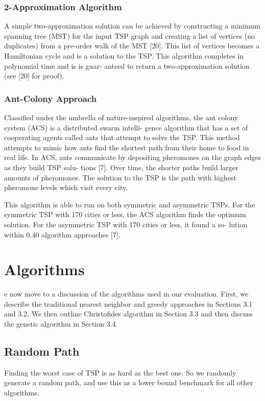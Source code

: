 \documentclass[10pt,twocolumn,letterpaper]{article}
\begin{document}
\subsubsection{2-Approximation Algorithm}
A simple two-approximation solution can be achieved by
constructing a minimum spanning tree (MST) for the input
TSP graph and creating a list of vertices (no duplicates)
from a pre-order walk of the MST [20]. This list of vertices
becomes a Hamiltonian cycle and is a solution to the TSP.
This algorithm completes in polynomial time and is is guar-
anteed to return a two-approximation solution (see [20] for
proof).

\subsubsection{Ant-Colony Approach}
Classified under the umbrella of nature-inspired algorithms,
the ant colony system (ACS) is a distributed swarm intelli-
gence algorithm that has a set of cooperating agents called
ants that attempt to solve the TSP. This method attempts
to mimic how ants find the shortest path from their home to
food in real life. In ACS, ants communicate by depositing
pheromones on the graph edges as they build TSP solu-
tions [7]. Over time, the shorter paths build larger amounts
of pheromones. The solution to the TSP is the path with
highest pheromone levels which visit every city.

This algorithm is able to run on both symmetric and
asymmetric TSPs. For the symmetric TSP with 170 cities
or less, the ACS algorithm finds the optimum solution. For
the asymmetric TSP with 170 cities or less, it found a so-
lution within 0.40%
algorithm approaches [7].
\section{Algorithms}
e now move to a discussion of the algorithms used in
our evaluation. First, we describe the traditional nearest
neighbor and greedy approaches in Sections 3.1 and 3.2. We
then outline Christofides algorithm in Section 3.3 and then
discuss the genetic algorithm in Section 3.4.

\subsection{Random Path}
Finding the worst case of TSP is as hard as the best one.
So we randomly generate a random path, 
and use this as a lower bound benchmark for all other algorithms.
\end{document}

